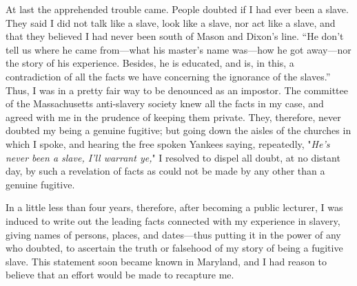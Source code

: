 At last the apprehended trouble came. People doubted if I had ever been
a slave. They said I did not talk like a slave, look like a slave, nor
act like a slave, and that they believed I had never been south of Mason
and Dixon's line. ``He don't tell us where he came from---what his
master's name was---how he got away---nor the story of his experience.
Besides, he is educated, and is, in this, a contradiction of all the
facts we have concerning the ignorance of the slaves.'' Thus, I was in a
pretty fair way to be denounced as an impostor. The committee of the
Massachusetts anti-slavery society knew all the facts in my case, and
agreed with me in the prudence of keeping them private. They, therefore,
never doubted my being a genuine fugitive; but going down the aisles of
the churches in which I spoke, and hearing the
{\protect\hypertarget{363}{}{}}free spoken Yankees saying, repeatedly,
"\emph{He's never been a slave, I'll warrant ye,}" I resolved to dispel
all doubt, at no distant day, by such a revelation of facts as could not
be made by any other than a genuine fugitive.

In a little less than four years, therefore, after becoming a public
lecturer, I was induced to write out the leading facts connected with my
experience in slavery, giving names of persons, places, and dates---thus
putting it in the power of any who doubted, to ascertain the truth or
falsehood of my story of being a fugitive slave. This statement soon
became known in Maryland, and I had reason to believe that an effort
would be made to recapture me.

